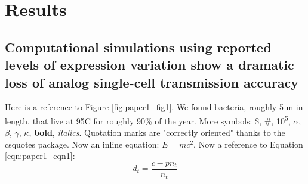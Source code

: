 \section{Results}
\subsection{Computational simulations using reported levels of expression variation show a dramatic loss of analog single-cell transmission accuracy}
Here is a reference to Figure \ref{fig:paper1_fig1}.
We found bacteria, roughly 5 \si{\mu}m in length, that live at 95\degree C for roughly 90\% of the year. More symbols: \$, \#, 10\textsuperscript{5}, $\alpha$, $\beta$, $\gamma$, $\kappa$, \textbf{bold}, \textit{italics}.
Quotation marks are "correctly oriented" thanks to the csquotes package.
Now an inline equation: $E = mc^2$. Now a reference to Equation \ref{eqn:paper1_eqn1}:
\begin{equation}\label{eqn:paper1_eqn1}
d_t = \frac{c - pn_t}{n_t}
\end{equation}

